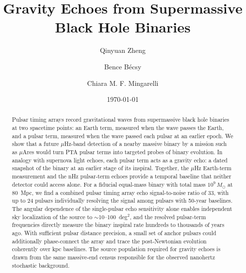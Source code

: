 \documentclass[aps,prx,twocolumn,superscriptaddress,nofootinbib,longbibliography]{revtex4-2}
\begin{document}
\title{Gravity Echoes from Supermassive Black Hole Binaries}

\author{Qinyuan Zheng}


\author{Bence B\'ecsy}

\author{Chiara M. F. Mingarelli}
\date{\today}


\begin{abstract}
\noindent Pulsar timing arrays record gravitational waves from supermassive black hole binaries at two spacetime points: an Earth term, measured when the wave passes the Earth, and a pulsar term, measured when the wave passed each pulsar at an earlier epoch. We show that a future $\mu$Hz-band detection of a nearby massive binary by a mission such as $\mu$Ares would turn PTA pulsar terms into targeted probes of binary evolution. In analogy with supernova light echoes, each pulsar term acts as a gravity echo: a dated snapshot of the binary at an earlier stage of its inspiral. Together, the $\mu$Hz Earth-term measurement and the nHz pulsar-term echoes provide a temporal baseline that neither detector could access alone. For a fiducial equal-mass binary with total mass $10^9\,M_\odot$ at 80~Mpc, we find a combined pulsar timing array echo signal-to-noise ratio of 33, with up to 24 pulsars individually resolving the signal among pulsars with 50-year baselines. The angular dependence of the single-pulsar echo sensitivity alone enables independent sky localization of the source to $\sim$10--100~deg$^2$, and the resolved pulsar-term frequencies directly measure the binary inspiral rate hundreds to thousands of years ago. With sufficient pulsar distance precision, a small set of anchor pulsars could additionally phase-connect the array and trace the post-Newtonian evolution coherently over kpc baselines. The source population required for gravity echoes is drawn from the same massive-end census responsible for the observed nanohertz stochastic background.
\end{abstract}
\maketitle
\end{document}
